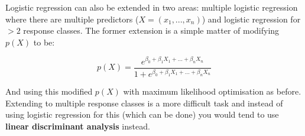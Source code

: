 Logistic regression can also be extended in two areas: multiple logistic regression where there are multiple predictors ($X=(x_{1},...,x_{n})$) and logistic regression for $>2$ response classes. The former extension is a simple matter of modifying $p(X)$ to be:

$$ p(X) = \frac{e^{\beta_{0}+\beta_{1}X_{1} + ... + \beta_{n}X_{n}}}{1+e^{\beta_{0}+\beta_{1}X_{1} + ... + \beta_{n}X_{n}}} $$

And using this modified $p(X)$ with maximum likelihood optimisation as before. Extending to multiple response classes is a more difficult task and instead of using logistic regression for this (which can be done) you would tend to use \textbf{linear discriminant analysis} instead.
